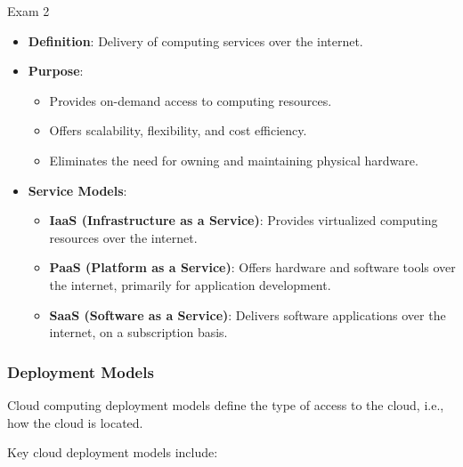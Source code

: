 \begin{examnotes}{Exam 2}
\begin{highlight}
        \begin{itemize}
            \item \textbf{Definition}: Delivery of computing services over the internet.
            \item \textbf{Purpose}:
                \begin{itemize}
                    \item Provides on-demand access to computing resources.
                    \item Offers scalability, flexibility, and cost efficiency.
                    \item Eliminates the need for owning and maintaining physical hardware.
                \end{itemize}
            \item \textbf{Service Models}:
                \begin{itemize}
                    \item \textbf{IaaS (Infrastructure as a Service)}: Provides virtualized computing resources over the internet.
                    \item \textbf{PaaS (Platform as a Service)}: Offers hardware and software tools over the internet, primarily for application development.
                    \item \textbf{SaaS (Software as a Service)}: Delivers software applications over the internet, on a subscription basis.
                \end{itemize}
        \end{itemize}
    \end{highlight}
    
    \subsubsection*{Deployment Models}
    
    Cloud computing deployment models define the type of access to the cloud, i.e., how the cloud is located.
    
    \begin{highlight}
        Key cloud deployment models include:
        

\end{highlight}
\end{examnotes}
